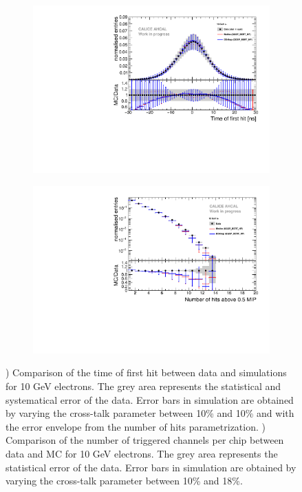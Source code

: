 \begin{figure}[htbp!]
	\centering
	\begin{subfigure}[t]{0.49\textwidth}
		\includegraphics[width=1\textwidth]{../Thesis_Plots/Timing/Electrons/Plots/Comparison_SimData_Electrons10GeV.pdf}
		\caption{}\label{fig:elec_sim_data_10GeV}
	\end{subfigure}
	\hfill
	\begin{subfigure}[t]{0.49\textwidth}
		\includegraphics[width=1\textwidth]{../Thesis_Plots/Timing/Electrons/Plots/Comparison_SimData_Electrons_nHits_10GeV.pdf}
		\caption{}\label{fig:elec_sim_data_nHits_10GeV}
	\end{subfigure}
	\caption{) Comparison of the time of first hit between data and simulations for 10 GeV electrons. The grey area represents the statistical and systematical error of the data. Error bars in simulation are obtained by varying the cross-talk parameter between 10\% and 10\% and with the error envelope from the number of hits parametrization. ) Comparison of the number of triggered channels per chip between data and MC for 10 GeV electrons. The grey area represents the statistical error of the data. Error bars in simulation are obtained by varying the cross-talk parameter between 10\% and 18\%.}
\end{figure}

